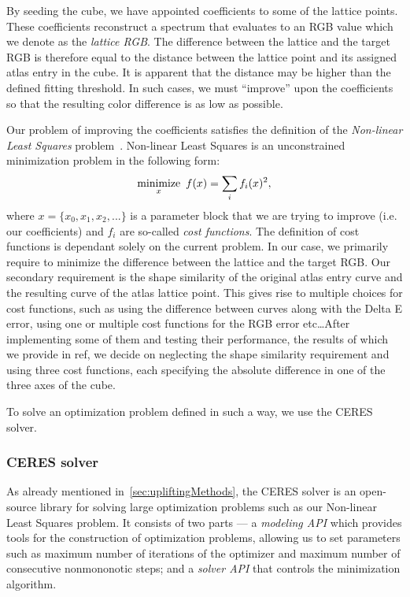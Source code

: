 By seeding the cube, we have appointed coefficients to some of the lattice points. These coefficients reconstruct a spectrum that evaluates to an RGB value which we denote as the \emph{lattice RGB}. The difference between the lattice and the target RGB is therefore equal to the distance between the lattice point and its assigned atlas entry in the cube. It is apparent that the distance may be higher than the defined fitting threshold. In such cases, we must ``improve'' upon the coefficients so that the resulting color difference is as low as possible.

Our problem of improving the coefficients satisfies the definition of the \emph{Non-linear Least Squares} problem~\cite{nonLinearLeastSquares}. Non-linear Least Squares is an unconstrained minimization problem in the following form:
\begin{equation} \label{eq:nonLinearLeastSquares}
	 \underset{x}{\text{minimize}} \hspace{0.5em} f(x) = \sum_{i} f_{i}(x)^{2},
\end{equation}
where $x= \{x_{0}, x_{1}, x_{2}, ... \}$ is a parameter block that we are trying to improve (i.e. our coefficients) and $f_{i}$ are so-called \emph{cost functions}. The definition of cost functions is dependant solely on the current problem. In our case, we primarily require to minimize the difference between the lattice and the target RGB. Our secondary requirement is the shape similarity of the original atlas entry curve and the resulting curve of the atlas lattice point. This gives rise to multiple choices for cost functions, such as using the difference between curves along with the Delta E error, using one or multiple cost functions for the RGB error etc\ldots After implementing some of them and testing their performance, the results of which we provide in ref, we decide on neglecting the shape similarity requirement and using three cost functions, each specifying the absolute difference in one of the three axes of the cube.

To solve an optimization problem defined in such a way, we use the CERES solver.

\subsubsection{CERES solver} \label{ssec:ceresSolver}

As already mentioned in~\cref{sec:upliftingMethods}, the CERES solver is an open-source library for solving large optimization problems such as our Non-linear Least Squares problem. It consists of two parts --- a \emph{modeling API} which provides tools for the construction of optimization problems, allowing us to set parameters such as maximum number of iterations of the optimizer and maximum number of consecutive nonmononotic steps; and a \emph{solver API} that controls the minimization algorithm.

